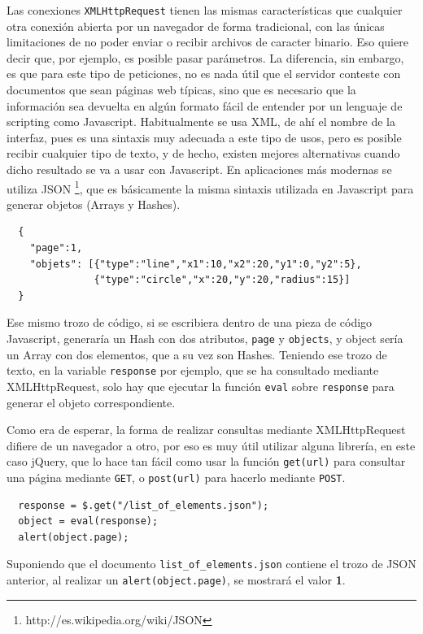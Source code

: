 Las conexiones \texttt{XMLHttpRequest} tienen las mismas características que cualquier otra conexión abierta por un navegador de forma tradicional, con las únicas limitaciones de no poder enviar o recibir archivos de caracter binario. Eso quiere decir que, por ejemplo, es posible pasar parámetros. La diferencia, sin embargo, es que para este tipo de peticiones, no es nada útil que el servidor conteste con documentos que sean páginas web típicas, sino que es necesario que la información sea devuelta en algún formato fácil de entender por un lenguaje de scripting como Javascript. Habitualmente se usa XML, de ahí el nombre de la interfaz, pues es una sintaxis muy adecuada a este tipo de usos, pero es posible recibir cualquier tipo de texto, y de hecho, existen mejores alternativas cuando dicho resultado se va a usar con Javascript. En aplicaciones más modernas se utiliza JSON \footnote{http://es.wikipedia.org/wiki/JSON}, que es básicamente la misma sintaxis utilizada en Javascript para generar objetos (Arrays y Hashes).

\begin{verbatim}
  {
    "page":1,
    "objets": [{"type":"line","x1":10,"x2":20,"y1":0,"y2":5},
               {"type":"circle","x":20,"y":20,"radius":15}]
  }
\end{verbatim}

Ese mismo trozo de código, si se escribiera dentro de una pieza de código Javascript, generaría un Hash con dos atributos, \texttt{page} y \texttt{objects}, y object sería un Array con dos elementos, que a su vez son Hashes. Teniendo ese trozo de texto, en la variable \texttt{response} por ejemplo, que se ha consultado mediante XMLHttpRequest, solo hay que ejecutar la función \texttt{eval} sobre \texttt{response} para generar el objeto correspondiente.

Como era de esperar, la forma de realizar consultas mediante XMLHttpRequest difiere de un navegador a otro, por eso es muy útil utilizar alguna librería, en este caso jQuery, que lo hace tan fácil como usar la función \texttt{get(url)} para consultar una página mediante \texttt{GET}, o \texttt{post(url)} para hacerlo mediante \texttt{POST}.

\begin{verbatim}
  response = $.get("/list_of_elements.json");
  object = eval(response);
  alert(object.page);
\end{verbatim}

Suponiendo que el documento \texttt{list\_of\_elements.json} contiene el trozo de JSON anterior, al realizar un \texttt{alert(object.page)}, se mostrará el valor \textbf{1}.

